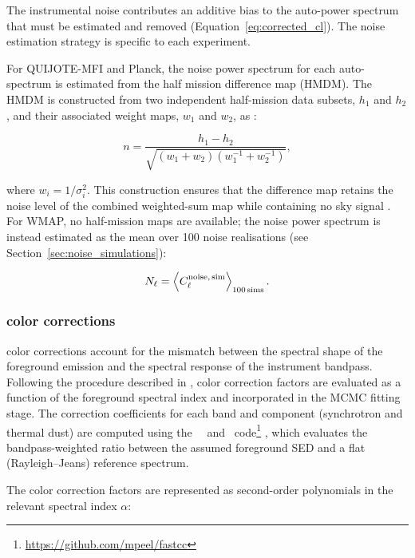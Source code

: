 The instrumental noise contributes an additive bias to the auto-power spectrum that must be estimated and removed (Equation~\ref{eq:corrected_cl}). The noise estimation strategy is specific to each experiment.

For QUIJOTE-MFI and Planck, the noise power spectrum for each auto-spectrum is estimated from the half mission difference map (HMDM). The HMDM is constructed from two independent half-mission data subsets, $h_1$ and $h_2$, and their associated weight maps, $w_1$ and $w_2$, as \citep{QUIJOTE_IV}:

\begin{equation}
    \label{eq:hmdm}
    n = \frac{h_1 - h_2}{\sqrt{(w_1 + w_2)(w_1^{-1} + w_2^{-1})}},
\end{equation}

where $w_i = 1/\sigma_i^2$. This construction ensures that the difference map retains the noise level of the combined weighted-sum map while containing no sky signal \citep{Planck_2014II, Planck_2016VIII}. For WMAP, no half-mission maps are available; the noise power spectrum is instead estimated as the mean over 100 noise realisations (see Section~\ref{sec:noise_simulations}):

\begin{equation}
    N_\ell = \left\langle C_\ell^{\rm noise,\, sim} \right\rangle_{100\,\rm sims}.
\end{equation}

\subsubsection{color corrections}
\label{sec:color_corrections}

color corrections account for the mismatch between the spectral shape of the foreground emission and the spectral response of the instrument bandpass. Following the procedure described in \citet{Planck_2020LVII}, color correction factors are evaluated as a function of the foreground spectral index and incorporated in the MCMC fitting stage. The correction coefficients for each band and component (synchrotron and thermal dust) are computed using the \fastcc\ \python\ and \IDL\ code\footnote{\url{https://github.com/mpeel/fastcc}} \citep{Fastcc}, which evaluates the bandpass-weighted ratio between the assumed foreground SED and a flat (Rayleigh--Jeans) reference spectrum.

The color correction factors are represented as second-order polynomials in the relevant spectral index $\alpha$:

